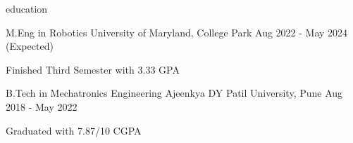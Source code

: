 \begin{section}{education}

  \begin{school}
    {M.Eng in Robotics}
    {University of Maryland, College Park}
    {Aug 2022 - May 2024 (Expected)}

    \item Finished Third Semester with 3.33 GPA

  \end{school}

  \begin{school}
    {B.Tech in Mechatronics Engineering}
    {Ajeenkya DY Patil University, Pune}
    {Aug 2018 - May 2022}

    \item Graduated with 7.87/10 CGPA

  \end{school}

\end{section}
